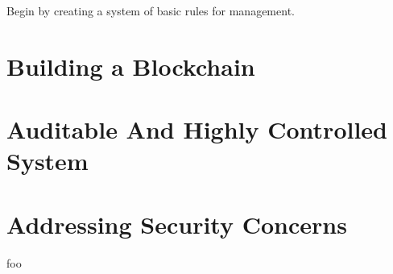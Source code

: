\documentclass[11pt,letterpaper]{article}
\begin{document}
	Begin by creating a system of basic rules for management.
	 
	
	
	
	\section{Building a Blockchain}
	
	
	
	
	
	
	
	\section{Auditable And Highly Controlled System}
	
	
	
	
	\section{Addressing Security Concerns}
	foo \cite{camilleri2010playing}
	 \cite{tezos}
	
	
\end{document}
